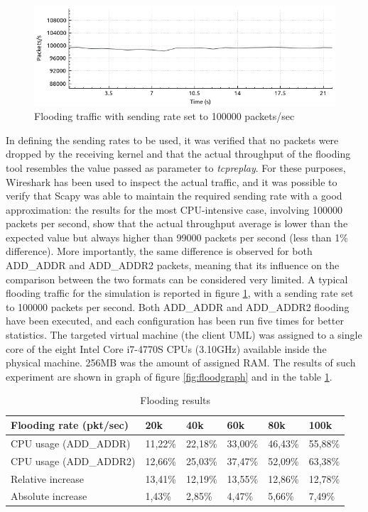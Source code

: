 \begin{figure}[!htb]
\centering
\includegraphics[width=\textwidth]{images/wirethrough}
\caption{Flooding traffic with sending rate set to 100000 packets/sec}
\label{fig:sendgraph}
\end{figure}

In defining the sending rates to be used, it was verified that no packets were dropped by the receiving kernel and that the actual throughput of the flooding tool resembles the value passed as parameter to \textit{tcpreplay}. For these purposes, Wireshark has been used to inspect the actual traffic, and it was possible to verify that Scapy was able to maintain the required sending rate with a good approximation: the results for the most CPU-intensive case, involving 100000 packets per second, show that the actual throughput average is lower than the expected value but always higher than 99000 packets per second (less than 1\% difference). More importantly, the same difference is observed for both ADD\_ADDR and ADD\_ADDR2 packets, meaning that its influence on the comparison between the two formats can be considered very limited. A typical flooding traffic for the simulation is reported in figure \ref{fig:sendgraph}, with a sending rate set to 100000 packets per second. Both ADD\_ADDR and ADD\_ADDR2 flooding have been executed, and each configuration has been run five times for better statistics. The targeted virtual machine (the client UML) was assigned to a single core of the eight Intel Core i7-4770S CPUs (3.10GHz) available inside the physical machine. 256MB was the amount of assigned RAM. The results of such experiment are shown in graph of figure \ref{fig:floodgraph} and in the table \ref{table:floodtable}.

\begin{table}[h!]
\centering
\begin{tabular}{ |p{5cm}|p{1.2cm}|p{1.2cm}|p{1.2cm}|p{1.2cm}|p{1.2cm}|   }
\hline
Flooding rate (pkt/sec) &20k&40k&60k&80k&100k \\
\hline
CPU usage (ADD\_ADDR) & 11,22\% & 22,18\% & 33,00\% & 46,43\% & 55,88\% \\
CPU usage (ADD\_ADDR2) & 12,66\% & 25,03\% & 37,47\% & 52,09\% & 63,38\% \\
Relative increase & 13,41\% & 12,19\% & 13,55\% & 12,86\% & 12,78\% \\
Absolute increase & 1,43\% & 2,85\% & 4,47\% & 5,66\% & 7,49\% \\
\hline
\end{tabular}
\caption{Flooding results}
\label{table:floodtable}
\end{table}

